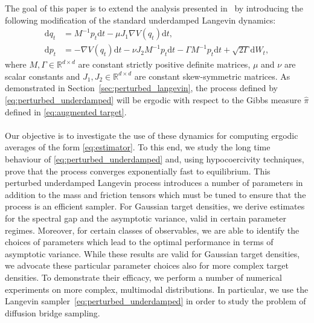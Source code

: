 The goal of this paper is to extend the analysis presented in~\cite{duncan2016variance,LelievreNierPavliotis2013} by introducing the following modification of the standard underdamped Langevin dynamics:
\begin{equation}
\label{eq:perturbed_underdamped}
\begin{aligned}
\mathrm{d}q_{t} & =M^{-1}p_{t}\mathrm{d}t-\mu J_{1}\nabla V(q_{t})\mathrm{d}t, \\
\mathrm{d}p_{t} & =-\nabla V(q_{t})\mathrm{d}t-\nu J_{2}M^{-1}p_{t}\mathrm{d}t-\Gamma M^{-1}p_{t}\mathrm{d}t+\sqrt{2\Gamma}\mathrm{d}W_{t},
\end{aligned}
\end{equation}
where $M,\Gamma\in\mathbb{R}^{d\times d}$ are constant strictly positive definite matrices, $\mu$ and $\nu$ are scalar constants and $J_1, J_2 \in \mathbb{R}^{d\times d}$ are constant skew-symmetric matrices. 
As demonstrated in Section~\ref{sec:perturbed_langevin}, the process defined by \eqref{eq:perturbed_underdamped} will be ergodic with respect to the Gibbs measure $\widehat{\pi}$ defined in \eqref{eq:augmented target}.  
\\\\
Our objective is to investigate the use of these dynamics for computing ergodic averages of the form \eqref{eq:estimator}. To this end, we study the long time behaviour of \eqref{eq:perturbed_underdamped} and, using hypocoercivity techniques, prove that the process converges exponentially fast to equilibrium.  This perturbed underdamped Langevin process introduces a number of parameters in addition to the mass and friction tensors which must be tuned to ensure that the process is an efficient sampler.  For Gaussian target densities, we derive estimates for the spectral gap and the asymptotic variance, valid in certain parameter regimes.  Moreover, for certain classes of observables, we are able to identify the choices of parameters which lead to the optimal performance in terms of asymptotic variance. While these results are valid for Gaussian target densities, we advocate these particular parameter choices also for more complex target densities.  To demonstrate their efficacy, we perform a number of numerical experiments on more complex, multimodal distributions. In particular, we use the Langevin sampler~\eqref{eq:perturbed_underdamped} in order to study the problem of diffusion bridge sampling. 
\\\\
